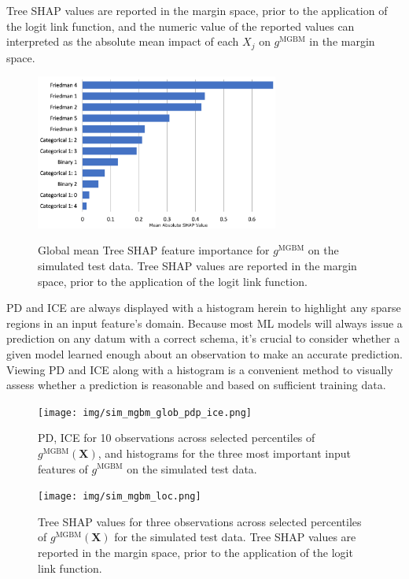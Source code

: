 \documentclass[information,article,submit,moreauthors,pdftex]{definitions/mdpi}
\begin{document}
{Tree SHAP values are reported in the margin space, prior to the application of the logit link function, and the numeric value of the reported values can interpreted as the absolute mean impact of each $X_j$ on $g^\text{MGBM}$ in the margin space. 

\begin{figure}[H]
\centering
\includegraphics[width=8cm]{img/sim_mgbm_glob.png}
\label{fig:sim_mgbm_glob}
\caption{Global mean Tree SHAP feature importance for $g^\text{MGBM}$ on the simulated test data. Tree SHAP values are reported in the margin space, prior to the application of the logit link function.}
\end{figure}   

PD and ICE are always displayed with a histogram herein to highlight any sparse regions in an input feature's domain. Because most ML models will always issue a prediction on any datum with a correct schema, it's crucial to consider whether a given model learned enough about an observation to make an accurate prediction. Viewing PD and ICE along with a histogram is a convenient method to visually assess whether a prediction is reasonable and based on sufficient training data.

\begin{figure}[H]
\centering
\texttt{[image: img/sim\_mgbm\_glob\_pdp\_ice.png]}
\label{fig:sim_mgbm_glob_pdp_ice}
\caption{PD, ICE for 10 observations across selected percentiles of $g^\text{MGBM}(\mathbf{X})$, and histograms for the three most important input features of $g^\text{MGBM}$ on the simulated test data.}
\end{figure}   

\begin{figure}[H]
\centering
\texttt{[image: img/sim\_mgbm\_loc.png]}
\label{fig:sim_mgbm_loc}
\caption{Tree SHAP values for three observations across selected percentiles of $g^\text{MGBM}(\mathbf{X})$ for the simulated test data. Tree SHAP values are reported in the margin space, prior to the application of the logit link function.}
\end{figure}   

}
\end{document}
